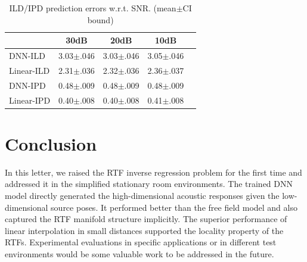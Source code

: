 \documentclass[journal]{IEEEtran}
\begin{document}
\begin{table}
\caption{ILD/IPD prediction errors w.r.t. SNR. (mean$\pm$CI bound)}
\label{table:noise}
\begin{center}
\begin{tabular}{|l|c|c|c|c|}
  \hline
                 & 30dB         & 20dB         & 10dB       \\ \hline \hline
   DNN-ILD     &3.03$\pm$.046  &3.03$\pm$.046 &3.05$\pm$.046  \\ \hline
   Linear-ILD  &2.31$\pm$.036  &2.32$\pm$.036 &2.36$\pm$.037   \\ \hline
   DNN-IPD     & 0.48$\pm$.009 & 0.48$\pm$.009 & 0.48$\pm$.009 \\ \hline
   Linear-IPD  & 0.40$\pm$.008 & 0.40$\pm$.008 &0.41$\pm$.008  \\ \hline
\end{tabular}
\end{center}
\end{table}


\section{Conclusion}

In this letter, we raised the RTF inverse regression problem for the first time and addressed it in the simplified stationary room environments. The trained DNN model directly generated the high-dimensional acoustic responses given the low-dimensional source poses. It performed better than the free field model and also captured the RTF manifold structure implicitly. The superior performance of linear interpolation in small distances supported the locality property of the RTFs. Experimental evaluations in specific applications or in different test environments would be some valuable work to be addressed in the future.

\end{document}
